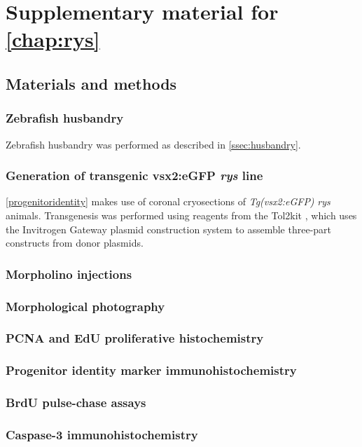 \chapter{Supplementary material for \autoref{chap:rys}}
\section{Materials and methods}
\subsection{Zebrafish husbandry}
Zebrafish husbandry was performed as described in \autoref{ssec:husbandry}.

\subsection{Generation of transgenic vsx2:eGFP \textit{rys} line}
\autoref{progenitoridentity} makes use of coronal cryosections of \textit{Tg(vsx2:eGFP)} \textit{rys} animals. Transgenesis was performed using reagents from the Tol2kit \cite{Kwan2007}, which uses the Invitrogen Gateway plasmid construction system to assemble three-part constructs from donor plasmids. 

\subsection{Morpholino injections}
 
\subsection{Morphological photography}

\subsection{PCNA and EdU proliferative histochemistry}

\subsection{Progenitor identity marker immunohistochemistry}

\subsection{BrdU pulse-chase assays}

\subsection{Caspase-3 immunohistochemistry}

